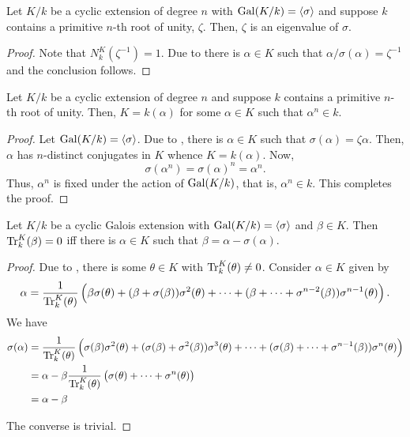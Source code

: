 \begin{lemma}
    Let $K/k$ be a cyclic extension of degree $n$ with $\operatorname{Gal}(K/k) = \langle\sigma\rangle$ and suppose $k$ contains a primitive $n$-th root of unity, $\zeta$. Then, $\zeta$ is an eigenvalue of $\sigma$.
\end{lemma}
\begin{proof}
    Note that $N^K_k(\zeta^{-1}) = 1$. Due to  there is $\alpha\in K$ such that $\alpha/\sigma(\alpha) = \zeta^{-1}$ and the conclusion follows.
\end{proof}

\begin{theorem}
    Let $K/k$ be a cyclic extension of degree $n$ and suppose $k$ contains a primitive $n$-th root of unity. Then, $K = k(\alpha)$ for some $\alpha\in K$ such that $\alpha^n\in k$.
\end{theorem}
\begin{proof}
    Let $\operatorname{Gal}(K/k) =\langle\sigma\rangle$. Due to , there is $\alpha\in K$ such that $\sigma(\alpha) = \zeta\alpha$. Then, $\alpha$ has $n$-distinct conjugates in $K$ whence $K = k(\alpha)$. Now, 
    \begin{equation*}
        \sigma(\alpha^n) = \sigma(\alpha)^n = \alpha^n.
    \end{equation*}
    Thus, $\alpha^n$ is fixed under the action of $\operatorname{Gal}(K/k)$, that is, $\alpha^n\in k$. This completes the proof.
\end{proof}

\begin{theorem}
    Let $K/k$ be a cyclic Galois extension with $\operatorname{Gal}(K/k) = \langle\sigma\rangle$ and $\beta\in K$. Then $\operatorname{Tr}^K_k(\beta) = 0$ iff there is $\alpha\in K$ such that $\beta = \alpha - \sigma(\alpha)$.
\end{theorem}
\begin{proof}
    Due to , there is some $\theta\in K$ with $\operatorname{Tr}^K_k(\theta)\ne0$. Consider $\alpha\in K$ given by 
    \begin{equation*}
        \alpha = \frac{1}{\operatorname{Tr}^K_k(\theta)}\left(\beta\sigma(\theta) + (\beta + \sigma(\beta))\sigma^2(\theta) + \dots + (\beta + \dots + \sigma^{n - 2}(\beta))\sigma^{n - 1}(\theta)\right).
    \end{equation*}
    We have 
    \begin{align*}
        \sigma(\alpha) &= \frac{1}{\operatorname{Tr}^K_k(\theta)}\left(\sigma(\beta)\sigma^2(\theta) + (\sigma(\beta) + \sigma^2(\beta))\sigma^3(\theta) + \dots + (\sigma(\beta) + \dots + \sigma^{n - 1}(\beta))\sigma^n(\theta)\right)\\
        &= \alpha - \beta\frac{1}{\operatorname{Tr}^K_k(\theta)}\left(\sigma(\theta) + \dots + \sigma^n(\theta)\right)\\
        &= \alpha - \beta
    \end{align*}

    The converse is trivial.
\end{proof}

